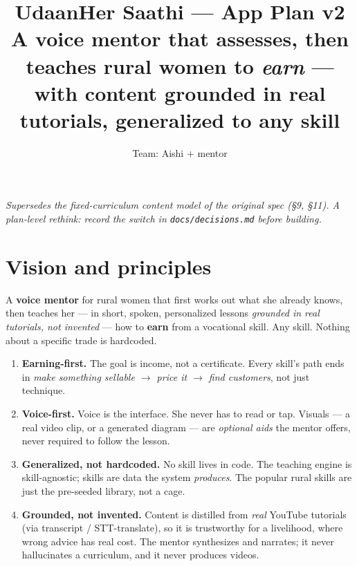 \documentclass[11pt]{article}
\title{\textbf{UdaanHer Saathi --- App Plan v2}\\
\large A voice mentor that assesses, then teaches rural women to \emph{earn} ---\\
with content grounded in real tutorials, generalized to any skill}
\author{Team: Aishi + mentor}
\date{}
\newcommand{\code}[1]{\texttt{#1}}
\begin{document}
\maketitle

\begin{center}\itshape\small
Supersedes the fixed-curriculum content model of the original spec (\S9, \S11).
A plan-level rethink: record the switch in \code{docs/decisions.md} before building.
\end{center}

\tableofcontents

\section{Vision and principles}

A \textbf{voice mentor} for rural women that first works out what she already knows, then
teaches her --- in short, spoken, personalized lessons \emph{grounded in real tutorials, not
invented} --- how to \textbf{earn} from a vocational skill. Any skill. Nothing about a specific
trade is hardcoded.

\begin{enumerate}
  \item \textbf{Earning-first.} The goal is income, not a certificate. Every skill's path ends in
  \emph{make something sellable $\rightarrow$ price it $\rightarrow$ find customers}, not just technique.
  \item \textbf{Voice-first.} Voice is the interface. She never has to read or tap. Visuals ---
  a real video clip, or a generated diagram --- are \emph{optional aids} the mentor offers, never
  required to follow the lesson.
  \item \textbf{Generalized, not hardcoded.} No skill lives in code. The teaching engine is
  skill-agnostic; skills are data the system \emph{produces}. The popular rural skills are just the
  pre-seeded library, not a cage.
  \item \textbf{Grounded, not invented.} Content is distilled from \emph{real} YouTube tutorials
  (via transcript / STT-translate), so it is trustworthy for a livelihood, where wrong advice has
  real cost. The mentor synthesizes and narrates; it never hallucinates a curriculum, and it never
  produces videos.
\end{enumerate}

\end{document}
